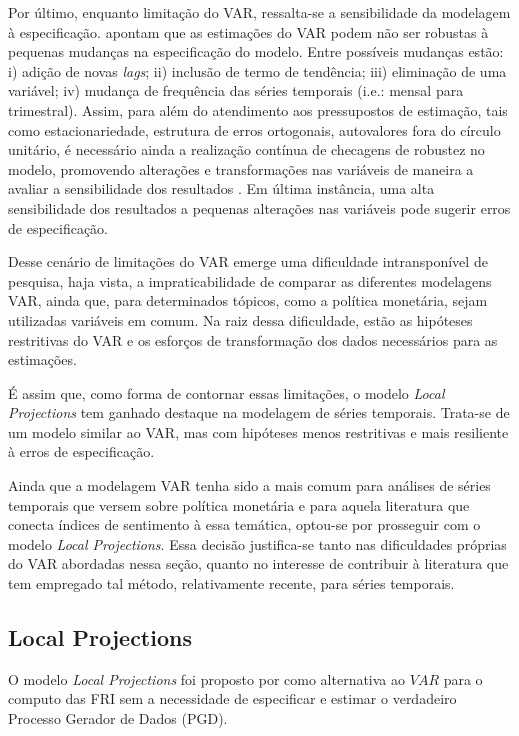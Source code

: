 Por último, enquanto limitação do VAR, ressalta-se a sensibilidade da modelagem à especificação. \textcite{enders_effectiveness_1993} apontam que as estimações do VAR podem não ser robustas à pequenas mudanças na especificação do modelo. Entre possíveis mudanças estão: i) adição de novas \textit{lags}; ii) inclusão de termo de tendência; iii) eliminação de uma variável; iv) mudança de frequência das séries temporais (i.e.: mensal para trimestral). Assim, para além do atendimento aos pressupostos de estimação, tais como estacionariedade, estrutura de erros ortogonais, autovalores fora do círculo unitário, é necessário ainda a realização contínua de checagens de robustez no modelo, promovendo alterações e transformações nas variáveis de maneira a avaliar a sensibilidade dos resultados \parencite{enders_applied_2015}. Em última instância, uma alta sensibilidade dos resultados a pequenas alterações nas variáveis pode sugerir erros de especificação.

Desse cenário de limitações do VAR emerge uma dificuldade intransponível de pesquisa, haja vista, a impraticabilidade de comparar as diferentes modelagens VAR, ainda que, para determinados tópicos, como a política monetária, sejam utilizadas variáveis em comum. Na raiz dessa dificuldade, estão as hipóteses restritivas do VAR e os esforços de transformação dos dados necessários para as estimações. 

É assim que, como forma de contornar essas limitações, o modelo \textit{Local Projections} tem ganhado destaque na modelagem de séries temporais. Trata-se de um modelo similar ao VAR, mas com hipóteses menos restritivas e mais resiliente à erros de especificação. 

Ainda que a modelagem VAR tenha sido a mais comum para análises de séries temporais que versem sobre política monetária e para aquela literatura que conecta índices de sentimento à essa temática, optou-se por prosseguir com o modelo \textit{Local Projections}. Essa decisão justifica-se tanto nas dificuldades próprias do VAR abordadas nessa seção, quanto no interesse de contribuir à literatura que tem empregado tal método, relativamente recente, para séries temporais.


\subsection{Local Projections}



O modelo \textit{Local Projections} foi proposto por \textcite{jorda_estimation_2005} como alternativa ao \(VAR\) para o computo das FRI sem a necessidade de especificar e estimar o verdadeiro Processo Gerador de Dados (PGD). 

